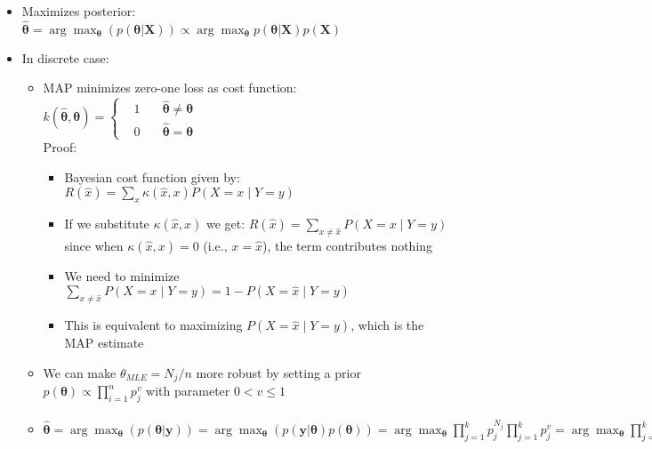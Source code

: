 \begin{itemize}
    \item Maximizes posterior: $\hat{\boldsymbol{\theta}} = \arg\max_{\boldsymbol{\theta}}( p(\boldsymbol{\theta}|\boldsymbol{X}) ) \propto \arg\max_{\boldsymbol{\theta}}p(\boldsymbol{\theta}|\boldsymbol{X}) p(\boldsymbol{X})$ 
    \item In discrete case:
    \begin{itemize}
        \item MAP minimizes zero-one loss as cost function:\\ $k(\hat{\boldsymbol{\theta}},\boldsymbol{\theta})  = 
        \left\{
            \begin{aligned}
                 & 1 \quad & \hat{\boldsymbol{\theta}} \neq \boldsymbol{\theta} \\
                 & 0 \quad & \hat{\boldsymbol{\theta}} = \boldsymbol{\theta}
            \end{aligned}
        \right.$\\
        Proof:
        \begin{itemize}
            \item Bayesian cost function given by:
            $
            R(\hat{x}) = \sum_{x} \kappa(\hat{x}, x) P(X = x \mid Y = y)
            $
            \item If we substitute $\kappa(\hat{x}, x) $ we get:
            $
            R(\hat{x}) = \sum_{x \neq \hat{x}} P(X = x \mid Y = y)
            $ since when $\kappa(\hat{x}, x) = 0$ (i.e., $x = \hat{x}$), the term contributes nothing
            \item We need to minimize $\sum_{x \neq \hat{x}} P(X = x \mid Y = y) = 1 - P(X = \hat{x} \mid Y = y) $
            \item This is equivalent to maximizing $P(X = \hat{x} \mid Y = y)$, which is the MAP estimate
        \end{itemize}
        \item We can make $\theta_{MLE} = N_j/n$ more robust by setting a prior $p(\boldsymbol{\theta}) \propto \prod_{i=1}^n p_j^v$ with parameter $0 < v \leq 1$
        \item $\hat{\boldsymbol{\theta}} = \arg\max_{\boldsymbol{\theta}}(p(\boldsymbol{\theta} | \boldsymbol{y})) = \arg\max_{\boldsymbol{\theta}}(p(\boldsymbol{y} |\boldsymbol{\theta}) p(\boldsymbol{\theta})) = \arg\max_{\boldsymbol{\theta}}\prod_{j=1}^k p_j^{N_j} \prod_{j=1}^k p_j^{v} = \arg\max_{\boldsymbol{\theta}} \prod_{j=1}^k p_j^{N_j + v} = \arg\max_{\boldsymbol{\theta}} \sum_{j=1}^k (N_j + v) \log(p_j) = \arg\max_{\boldsymbol{\theta}} \sum_{j=1}^k \frac{N_j + v}{n + kv} \log(\frac{p_j}{(N_j + v)/(n + kv)}) = \arg\min_{\boldsymbol{\theta}} \sum_{j=1}^k \frac{N_j + v}{n + kv} \log(\frac{(N_j + v)/(n + kv)}{p_j}) = \arg\min_{\boldsymbol{\theta}} \sum_{j=1}^k \tilde{p}_j \log(\frac{\tilde{p}_j}{p_j})$

\end{itemize}
\end{itemize}
